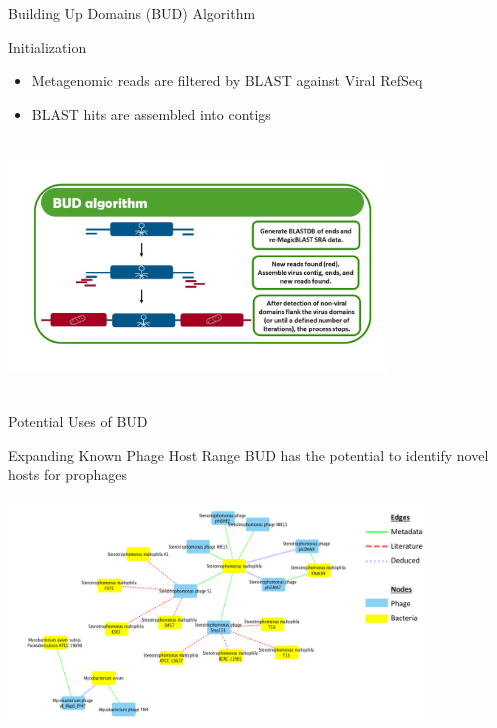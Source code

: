 \documentclass[11pt, xcolor=table]{beamer}
\begin{document}
	
	\begin{frame}{Building Up Domains (BUD) Algorithm}
	\begin{block}{Initialization}
	\begin{itemize}
	\item Metagenomic reads are filtered by BLAST against Viral RefSeq
	\item BLAST hits are assembled into contigs
	\end{itemize}
	\end{block}
	\vspace{-0.5cm}
	\center
	\includegraphics[height=6.75cm, width=10cm]{BUD_Algorithm.jpg}
	
	\end{frame}
	\begin{frame}{Potential Uses of BUD}

	\begin{block}{Expanding Known Phage Host Range}
	BUD has the potential to identify novel hosts for prophages
	
	\includegraphics[height=6cm, width=11cm]{network.png}
	\end{block}
	
	\end{frame}
\end{document}
